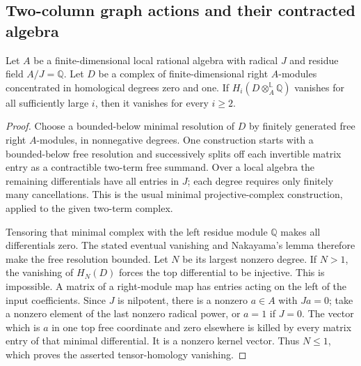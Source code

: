 \subsection{Two-column graph actions and their contracted algebra}

\begin{lemma}
\label{C:local-two-term-derived-tensor}
Let $A$ be a finite-dimensional local rational algebra with
radical $J$ and residue field $A/J=\mathbb Q$.  Let $D$ be a
complex of finite-dimensional right $A$-modules concentrated in
homological degrees zero and one.  If
$H_i(D\otimes_A^{\mathbb L}\mathbb Q)$ vanishes for all
sufficiently large $i$, then it vanishes for every $i\geq2$.
\end{lemma}
\begin{proof}
Choose a bounded-below minimal resolution of $D$ by finitely
generated free right $A$-modules, in nonnegative degrees.
One construction starts with a bounded-below free resolution
and successively splits off each invertible matrix entry as a
contractible two-term free summand.  Over a local algebra the
remaining differentials have all entries in $J$; each degree
requires only finitely many cancellations.  This is the usual
minimal projective-complex construction, applied to the given
two-term complex.

Tensoring that minimal complex with the left residue module
$\mathbb Q$ makes all differentials zero.  The stated eventual
vanishing and Nakayama's lemma therefore make the free resolution
bounded.  Let $N$ be its largest nonzero degree.  If $N>1$, the
vanishing of $H_N(D)$ forces the top differential to be injective.
This is impossible.  A matrix of a right-module map has entries
acting on the left of the input coefficients.  Since $J$ is
nilpotent, there is a nonzero $a\in A$ with $Ja=0$; take a
nonzero element of the last nonzero radical power, or $a=1$ if
$J=0$.  The vector which is $a$ in one top free coordinate and
zero elsewhere is killed by every matrix entry of that minimal
differential.  It is a nonzero kernel vector.  Thus $N\leq1$,
which proves the asserted tensor-homology vanishing.
\end{proof}

